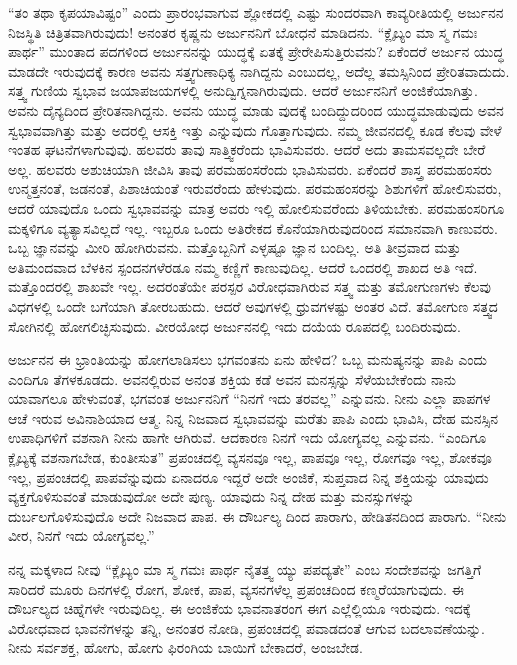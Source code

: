“ತಂ ತಥಾ ಕೃಪಯಾವಿಷ್ಟಂ” ಎಂದು ಪ್ರಾರಂಭವಾಗುವ ಶ್ಲೋಕದಲ್ಲಿ ಎಷ್ಟು ಸುಂದರವಾಗಿ ಕಾವ್ಯರೀತಿಯಲ್ಲಿ ಅರ್ಜುನನ ನಿಜಸ್ಥಿತಿ ಚಿತ್ರಿತವಾಗಿರುವುದು! ಅನಂತರ ಕೃಷ್ಣನು ಅರ್ಜುನನಿಗೆ ಬೋಧನೆ ಮಾಡಿದನು. “ಕ್ಲೈಬ್ಯಂ ಮಾ ಸ್ಮ ಗಮಃ ಪಾರ್ಥ” ಮುಂತಾದ ಪದಗಳಿಂದ ಅರ್ಜುನನನ್ನು ಯುದ್ಧಕ್ಕೆ ಏತಕ್ಕೆ ಪ್ರೇರೇಪಿಸುತ್ತಿರುವನು? ಏಕೆಂದರೆ ಅರ್ಜುನ ಯುದ್ಧ ಮಾಡದೇ ಇರುವುದಕ್ಕೆ ಕಾರಣ ಅವನು ಸತ್ತ್ವಗುಣಾಧಿಕ್ಯ ನಾಗಿದ್ದನು ಎಂಬುದಲ್ಲ, ಅದೆಲ್ಲ ತಮಸ್ಸಿನಿಂದ ಪ್ರೇರಿತವಾದುದು. ಸತ್ತ್ವ ಗುಣಿಯ ಸ್ವಭಾವ ಜಯಾಪಜಯಗಳಲ್ಲಿ ಅನುದ್ವಿಗ್ನನಾಗಿರುವುದು. ಆದರೆ ಅರ್ಜುನನಿಗೆ ಅಂಜಿಕೆಯಾಗಿತ್ತು. ಅವನು ದೈನ್ಯದಿಂದ ಪ್ರೇರಿತನಾಗಿದ್ದನು. ಅವನು ಯುದ್ಧ ಮಾಡು ವುದಕ್ಕೆ ಬಂದಿದ್ದುದರಿಂದ ಯುದ್ಧಮಾಡುವುದು ಅವನ ಸ್ವಭಾವವಾಗಿತ್ತು ಮತ್ತು ಅದರಲ್ಲಿ ಆಸಕ್ತಿ ಇತ್ತು ಎನ್ನುವುದು ಗೊತ್ತಾಗುವುದು. ನಮ್ಮ ಜೀವನದಲ್ಲಿ ಕೂಡ ಕೆಲವು ವೇಳೆ ಇಂತಹ ಘಟನೆಗಳಾಗುವುವು. ಹಲವರು ತಾವು ಸಾತ್ತ್ವಿಕರೆಂದು ಭಾವಿಸುವರು. ಆದರೆ ಅದು ತಾಮಸವಲ್ಲದೇ ಬೇರೆ ಅಲ್ಲ. ಹಲವರು ಅಶುಚಿಯಾಗಿ ಜೀವಿಸಿ ತಾವು ಪರಮಹಂಸರೆಂದು ಭಾವಿಸುವರು. ಏಕೆಂದರೆ ಶಾಸ್ತ್ರ ಪರಮಹಂಸರು ಉನ್ಮತ್ತನಂತೆ, ಜಡನಂತೆ, ಪಿಶಾಚಿಯಂತೆ ಇರುವರೆಂದು ಹೇಳುವುದು. ಪರಮಹಂಸರನ್ನು ಶಿಶುಗಳಿಗೆ ಹೋಲಿಸುವರು, ಆದರೆ ಯಾವುದೊ ಒಂದು ಸ್ವಭಾವವನ್ನು ಮಾತ್ರ ಅವರು ಇಲ್ಲಿ ಹೋಲಿಸುವರೆಂದು ತಿಳಿಯಬೇಕು. ಪರಮಹಂಸರಿಗೂ ಮಕ್ಕಳಿಗೂ ವ್ಯತ್ಯಾಸವಿಲ್ಲದೆ ಇಲ್ಲ. ಇಬ್ಬರೂ ಒಂದು ಅತಿರೇಕದ ಕೊನೆಯಾಗಿರುವುದರಿಂದ ಸಮಾನವಾಗಿ ಕಾಣುವರು. ಒಬ್ಬ ಜ್ಞಾನವನ್ನು ಮೀರಿ ಹೋಗಿರುವನು. ಮತ್ತೊಬ್ಬನಿಗೆ ಎಳ್ಳಷ್ಟೂ ಜ್ಞಾನ ಬಂದಿಲ್ಲ. ಅತಿ ತೀವ್ರವಾದ ಮತ್ತು ಅತಿಮಂದವಾದ ಬೆಳಕಿನ ಸ್ಪಂದನಗಳೆರಡೂ ನಮ್ಮ ಕಣ್ಣಿಗೆ ಕಾಣುವುದಿಲ್ಲ. ಆದರೆ ಒಂದರಲ್ಲಿ ಶಾಖದ ಅತಿ ಇದೆ. ಮತ್ತೊಂದರಲ್ಲಿ ಶಾಖವೇ ಇಲ್ಲ. ಅದರಂತೆಯೇ ಪರಸ್ಪರ ವಿರೋಧವಾಗಿರುವ ಸತ್ತ್ವ ಮತ್ತು ತಮೋಗುಣಗಳು ಕೆಲವು ವಿಧಗಳಲ್ಲಿ ಒಂದೇ ಬಗೆಯಾಗಿ ತೋರಬಹುದು. ಆದರೆ ಅವುಗಳಲ್ಲಿ ಧ್ರುವಗಳಷ್ಟು ಅಂತರ ವಿದೆ. ತಮೋಗುಣ ಸತ್ತ್ವದ ಸೋಗಿನಲ್ಲಿ ಹೋಗಲಿಚ್ಛಿಸುವುದು. ವೀರಯೋಧ ಅರ್ಜುನನಲ್ಲಿ ಇದು ದಯೆಯ ರೂಪದಲ್ಲಿ ಬಂದಿರುವುದು.

ಅರ್ಜುನನ ಈ ಭ್ರಾಂತಿಯನ್ನು ಹೋಗಲಾಡಿಸಲು ಭಗವಂತನು ಏನು ಹೇಳಿದ? ಒಬ್ಬ ಮನುಷ್ಯನನ್ನು ಪಾಪಿ ಎಂದು ಎಂದಿಗೂ ತೆಗಳಕೂಡದು. ಅವನಲ್ಲಿರುವ ಅನಂತ ಶಕ್ತಿಯ ಕಡೆ ಅವನ ಮನಸ್ಸನ್ನು ಸೆಳೆಯಬೇಕೆಂದು ನಾನು ಯಾವಾಗಲೂ ಹೇಳುವಂತೆ, ಭಗವಂತ ಅರ್ಜುನನಿಗೆ “ನಿನಗೆ ಇದು ತರವಲ್ಲ” ಎನ್ನುವನು. ನೀನು ಎಲ್ಲಾ ಪಾಪಗಳ ಆಚೆ ಇರುವ ಅವಿನಾಶಿಯಾದ ಆತ್ಮ. ನಿನ್ನ ನಿಜವಾದ ಸ್ವಭಾವವನ್ನು ಮರೆತು ಪಾಪಿ ಎಂದು ಭಾವಿಸಿ, ದೇಹ ಮನಸ್ಸಿನ ಉಪಾಧಿಗಳಿಗೆ ವಶನಾಗಿ ನೀನು ಹಾಗೇ ಆಗಿರುವೆ. ಆದಕಾರಣ ನಿನಗೆ ಇದು ಯೋಗ್ಯವಲ್ಲ ಎನ್ನುವನು. “ಎಂದಿಗೂ ಕ್ಲೈಬ್ಯಕ್ಕೆ ವಶನಾಗಬೇಡ, ಕುಂತೀಸುತ” ಪ್ರಪಂಚದಲ್ಲಿ ವ್ಯಸನವೂ ಇಲ್ಲ, ಪಾಪವೂ ಇಲ್ಲ, ರೋಗವೂ ಇಲ್ಲ, ಶೋಕವೂ ಇಲ್ಲ, ಪ್ರಪಂಚದಲ್ಲಿ ಪಾಪವೆನ್ನುವುದು ಏನಾದರೂ ಇದ್ದರೆ ಅದೇ ಅಂಜಿಕೆ, ಸುಪ್ತವಾದ ನಿನ್ನ ಶಕ್ತಿಯನ್ನು ಯಾವುದು ವ್ಯಕ್ತಗೊಳಿಸುವಂತೆ ಮಾಡುವುದೋ ಅದೇ ಪುಣ್ಯ. ಯಾವುದು ನಿನ್ನ ದೇಹ ಮತ್ತು ಮನಸ್ಸುಗಳನ್ನು ದುರ್ಬಲಗೊಳಿಸುವುದೊ ಅದೇ ನಿಜವಾದ ಪಾಪ. ಈ ದೌರ್ಬಲ್ಯ ದಿಂದ ಪಾರಾಗು, ಹೇಡಿತನದಿಂದ ಪಾರಾಗು. “ನೀನು ವೀರ, ನಿನಗೆ ಇದು ಯೋಗ್ಯವಲ್ಲ.”

ನನ್ನ ಮಕ್ಕಳಾದ ನೀವು “ಕ್ಲೈಬ್ಯಂ ಮಾ ಸ್ಮ ಗಮಃ ಪಾರ್ಥ ನೈತತ್ತ್ವ ಯ್ಯು ಪಪದ್ಯತೇ” ಎಂಬ ಸಂದೇಶವನ್ನು ಜಗತ್ತಿಗೆ ಸಾರಿದರೆ ಮೂರು ದಿನಗಳಲ್ಲಿ ರೋಗ, ಶೋಕ, ಪಾಪ, ವ್ಯಸನಗಳೆಲ್ಲ ಪ್ರಪಂಚದಿಂದ ಕಣ್ಮರೆಯಾಗುವುದು. ಈ ದೌರ್ಬಲ್ಯದ ಚಿಹ್ನೆಗಳೇ ಇರು\-ವುದಿಲ್ಲ. ಈ ಅಂಜಿಕೆಯ ಭಾವನಾತರಂಗ ಈಗ ಎಲ್ಲೆಲ್ಲಿಯೂ ಇರುವುದು. ಇದಕ್ಕೆ ವಿರೋಧ\-ವಾದ ಭಾವನೆಗಳನ್ನು ತನ್ನಿ, ಅನಂತರ ನೋಡಿ, ಪ್ರಪಂಚದಲ್ಲಿ ಪವಾಡದಂತೆ ಆಗುವ ಬದಲಾವಣೆಯನ್ನು. ನೀನು ಸರ್ವಶಕ್ತ, ಹೋಗು, ಹೋಗು ಫಿರಂಗಿಯ ಬಾಯಿಗೆ ಬೇಕಾದರೆ, ಅಂಜಬೇಡ.

